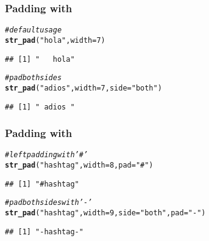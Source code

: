 \documentclass[12pt]{beamer}\usepackage[]{graphicx}\usepackage[]{color}
\makeatletter
\newcommand{\hlnum}[1]{\textcolor[rgb]{0.686,0.059,0.569}{#1}}%
\newcommand{\hlstr}[1]{\textcolor[rgb]{0.192,0.494,0.8}{#1}}%
\newcommand{\hlcom}[1]{\textcolor[rgb]{0.678,0.584,0.686}{\textit{#1}}}%
\newcommand{\hlstd}[1]{\textcolor[rgb]{0.345,0.345,0.345}{#1}}%
\newcommand{\hlkwc}[1]{\textcolor[rgb]{0.333,0.667,0.333}{#1}}%
\newcommand{\hlkwd}[1]{\textcolor[rgb]{0.737,0.353,0.396}{\textbf{#1}}}%
\newenvironment{kframe}{%
 \def\at@end@of@kframe{}%
 \ifinner\ifhmode%
  \def\at@end@of@kframe{\end{minipage}}%
  \begin{minipage}{\columnwidth}%
 \fi\fi%
 \def\FrameCommand##1{\hskip\@totalleftmargin \hskip-\fboxsep
 \colorbox{shadecolor}{##1}\hskip-\fboxsep
     \hskip-\linewidth \hskip-\@totalleftmargin \hskip\columnwidth}%
 \MakeFramed {\advance\hsize-\width
   \@totalleftmargin\z@ \linewidth\hsize
   \@setminipage}}%
 {\par\unskip\endMakeFramed%
 \at@end@of@kframe}
\newenvironment{knitrout}{}{} %
\makeatother
\begin{document}
\begin{frame}[fragile]
\frametitle{Padding with }

\begin{knitrout}\footnotesize
{}\color{fgcolor}\begin{kframe}
\begin{alltt}
\hlcom{# default usage}
\hlkwd{str_pad}\hlstd{(}\hlstr{"hola"}\hlstd{,} \hlkwc{width}\hlstd{=}\hlnum{7}\hlstd{)}
\end{alltt}
\begin{verbatim}
## [1] "   hola"
\end{verbatim}
\begin{alltt}
\hlcom{# pad both sides}
\hlkwd{str_pad}\hlstd{(}\hlstr{"adios"}\hlstd{,} \hlkwc{width}\hlstd{=}\hlnum{7}\hlstd{,} \hlkwc{side}\hlstd{=}\hlstr{"both"}\hlstd{)}
\end{alltt}
\begin{verbatim}
## [1] " adios "
\end{verbatim}
\end{kframe}
\end{knitrout}

\end{frame}


\begin{frame}[fragile]
\frametitle{Padding with }

\begin{knitrout}\footnotesize
{}\color{fgcolor}\begin{kframe}
\begin{alltt}
\hlcom{# left padding with '#'}
\hlkwd{str_pad}\hlstd{(}\hlstr{"hashtag"}\hlstd{,} \hlkwc{width}\hlstd{=}\hlnum{8}\hlstd{,} \hlkwc{pad}\hlstd{=}\hlstr{"#"}\hlstd{)}
\end{alltt}
\begin{verbatim}
## [1] "#hashtag"
\end{verbatim}
\begin{alltt}
\hlcom{# pad both sides with '-'}
\hlkwd{str_pad}\hlstd{(}\hlstr{"hashtag"}\hlstd{,} \hlkwc{width}\hlstd{=}\hlnum{9}\hlstd{,} \hlkwc{side}\hlstd{=}\hlstr{"both"}\hlstd{,} \hlkwc{pad}\hlstd{=}\hlstr{"-"}\hlstd{)}
\end{alltt}
\begin{verbatim}
## [1] "-hashtag-"
\end{verbatim}
\end{kframe}
\end{knitrout}

\end{frame}
\end{document}
